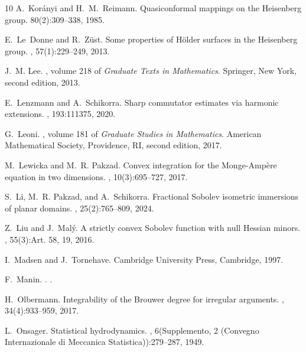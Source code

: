 \documentclass[intlimits,12pt,reqno]{amsart}
\numberwithin{equation}{section}
\theoremstyle{definition}
\begin{document}
\begin{thebibliography}{10}
A.~Kor\'anyi and H.~M.~Reimann.
\newblock Quasiconformal mappings on the Heisenberg group.
 80(2):309--338, 1985.

E.~Le~Donne and R.~Z\"{u}st.
\newblock Some properties of {H}\"{o}lder surfaces in the {H}eisenberg group.
, 57(1):229--249, 2013.

J.~M. Lee.
, volume 218 of {\em Graduate
  Texts in Mathematics}.
\newblock Springer, New York, second edition, 2013.

E.~Lenzmann and A.~Schikorra.
\newblock Sharp commutator estimates via harmonic extensions.
, 193:111375, 2020.

G.~Leoni.
, volume 181 of {\em Graduate
  Studies in Mathematics}.
\newblock American Mathematical Society, Providence, RI, second edition, 2017.

M.~Lewicka and M.~R. Pakzad.
\newblock Convex integration for the {M}onge-{A}mp\`ere equation in two
  dimensions.
, 10(3):695--727, 2017.

S.~Li, M.~R. Pakzad, and A.~Schikorra.
\newblock Fractional {S}obolev isometric immersions of planar domains.
, 25(2):765--809, 2024.

Z.~Liu and J.~Mal\'{y}.
\newblock A strictly convex {S}obolev function with null {H}essian minors.
, 55(3):Art. 58, 19,
  2016.

I.~Madsen and J.~Tornehave.
\newblock Cambridge University Press, Cambridge, 1997.


F.~Manin.
.
.

H.~Olbermann.
\newblock Integrability of the {B}rouwer degree for irregular arguments.
,
  34(4):933--959, 2017.

L.~Onsager.
\newblock Statistical hydrodynamics.
, 6(Supplemento, 2 (Convegno Internazionale di
  Meccanica Statistica)):279--287, 1949.


\end{thebibliography}
\end{document}
